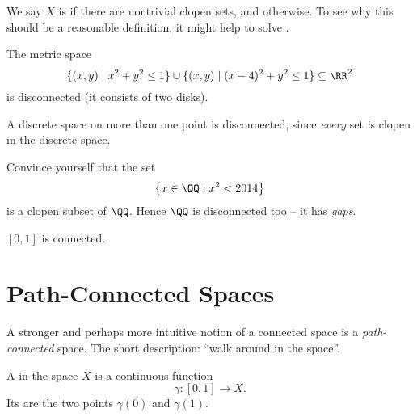 We say $X$ is  if there are nontrivial clopen sets,
and  otherwise.
To see why this should be a reasonable definition, it might help
to solve .

\begin{example}
	\listhack
	\begin{enumerate}[(a)]
		\ii The metric space 
		\[ \{ (x,y) \mid x^2+y^2\le 1 \} \cup \{ (x,y) \mid (x-4)^2+y^2\le1\} \subseteq \RR^2 \]
		is disconnected (it consists of two disks).

		\ii A discrete space on more than one point is disconnected,
		since \emph{every} set is clopen in the discrete space.

		\ii Convince yourself that the set 
		\[ \left\{ x \in \QQ : x^2 < 2014 \right\} \]
		is a clopen subset of $\QQ$. 
		Hence $\QQ$ is disconnected too -- it has \emph{gaps}.

		\ii $[0,1]$ is connected.
	\end{enumerate}
\end{example}


\section{Path-Connected Spaces}
A stronger and perhaps more intuitive notion of a connected space is a \emph{path-connected} space.
The short description: ``walk around in the space''.


\begin{definition}
	A  in the space $X$ is a continuous function
	\[ \gamma : [0,1] \to X. \]
	Its  are the two points $\gamma(0)$ and $\gamma(1)$.
\end{definition}

